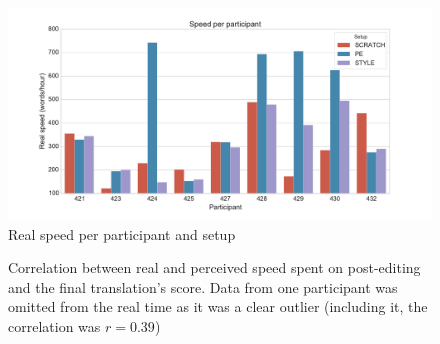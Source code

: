 \begin{figure}
    \myfloatalign
    \includegraphics[width=\textwidth]{img/time/time_speed_participant}
    \caption{Real speed per participant and setup}
    \label{fig:time_speed_participant}
\end{figure}

\begin{figure}[H]
    \myfloatalign
    \caption{Correlation between real and perceived speed spent on post-editing and the final translation's  score. Data from one participant was omitted from the real time as it was a clear outlier (including it, the correlation was $r = 0.39$)}
    \label{fig:time_bleu}
\end{figure}

